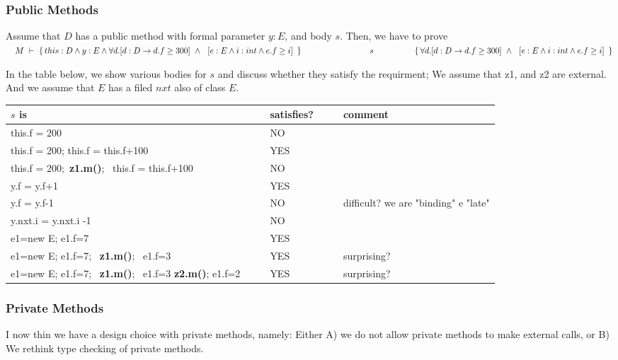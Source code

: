 \subsubsection{Public Methods}
Assume that $D$ has a public method  with formal parameter $y:E$, and body $s$. Then, we have to prove\\
$\strut \ \ \  \hprovesTwoLines {M} {this:D \wedge y:E \wedge  \forall d.[d:D \rightarrow d.f\geq 300]\ \wedge\  \  [ e:E \wedge i:int \wedge e.f \geq i]\ } {s}
{\forall d.[d:D \rightarrow d.f\geq 300]\ \wedge\  \  [ e:E \wedge i:int \wedge e.f \geq i]\ }$

\vspace{.1cm}

In the table below, we show various bodies for $s$ and discuss whether they satisfy the requirment; We assume that z1, and z2 are   external. And we assume that $E$ has a filed $nxt$ also of class $E$.

\begin{tabular}{lclcl}
$s$ is & & satisfies? &  & comment\\
\hline  
 this.f = 200  &\ \  & NO\\
  this.f = 200; this.f = this.f+100  & & YES\\
  this.f = 200;\   \textbf{z1.m()};  \ this.f = this.f+100  & & NO\\
  y.f = y.f+1   & & YES   \\
  y.f = y.f-1   & & NO & \ \  &  difficult? we are "binding" e "late"\\
 y.nxt.i = y.nxt.i -1   & & NO\\
 e1=new E; e1.f=7 & & YES\\
 e1=new E; e1.f=7; \   \textbf{z1.m()};  \ e1.f=3 &  & YES & & surprising?\\
  e1=new E; e1.f=7; \  \textbf{z1.m()};  \ e1.f=3  \textbf{z2.m()};  e1.f=2 &  & YES & & surprising?\\
 \hline
\end{tabular}

\subsubsection{Private Methods}

I now thin we have a design choice with private methods, namely: Either A) we do not allow private methods to make external calls, or B) We rethink type checking of
private methods. 

